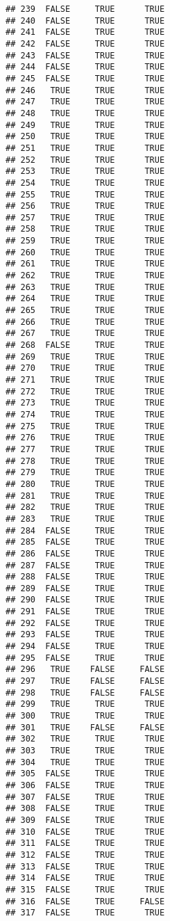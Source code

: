\documentclass[
]{article}
\begin{document}
\begin{verbatim}
## 239  FALSE     TRUE      TRUE
## 240  FALSE     TRUE      TRUE
## 241  FALSE     TRUE      TRUE
## 242  FALSE     TRUE      TRUE
## 243  FALSE     TRUE      TRUE
## 244  FALSE     TRUE      TRUE
## 245  FALSE     TRUE      TRUE
## 246   TRUE     TRUE      TRUE
## 247   TRUE     TRUE      TRUE
## 248   TRUE     TRUE      TRUE
## 249   TRUE     TRUE      TRUE
## 250   TRUE     TRUE      TRUE
## 251   TRUE     TRUE      TRUE
## 252   TRUE     TRUE      TRUE
## 253   TRUE     TRUE      TRUE
## 254   TRUE     TRUE      TRUE
## 255   TRUE     TRUE      TRUE
## 256   TRUE     TRUE      TRUE
## 257   TRUE     TRUE      TRUE
## 258   TRUE     TRUE      TRUE
## 259   TRUE     TRUE      TRUE
## 260   TRUE     TRUE      TRUE
## 261   TRUE     TRUE      TRUE
## 262   TRUE     TRUE      TRUE
## 263   TRUE     TRUE      TRUE
## 264   TRUE     TRUE      TRUE
## 265   TRUE     TRUE      TRUE
## 266   TRUE     TRUE      TRUE
## 267   TRUE     TRUE      TRUE
## 268  FALSE     TRUE      TRUE
## 269   TRUE     TRUE      TRUE
## 270   TRUE     TRUE      TRUE
## 271   TRUE     TRUE      TRUE
## 272   TRUE     TRUE      TRUE
## 273   TRUE     TRUE      TRUE
## 274   TRUE     TRUE      TRUE
## 275   TRUE     TRUE      TRUE
## 276   TRUE     TRUE      TRUE
## 277   TRUE     TRUE      TRUE
## 278   TRUE     TRUE      TRUE
## 279   TRUE     TRUE      TRUE
## 280   TRUE     TRUE      TRUE
## 281   TRUE     TRUE      TRUE
## 282   TRUE     TRUE      TRUE
## 283   TRUE     TRUE      TRUE
## 284  FALSE     TRUE      TRUE
## 285  FALSE     TRUE      TRUE
## 286  FALSE     TRUE      TRUE
## 287  FALSE     TRUE      TRUE
## 288  FALSE     TRUE      TRUE
## 289  FALSE     TRUE      TRUE
## 290  FALSE     TRUE      TRUE
## 291  FALSE     TRUE      TRUE
## 292  FALSE     TRUE      TRUE
## 293  FALSE     TRUE      TRUE
## 294  FALSE     TRUE      TRUE
## 295  FALSE     TRUE      TRUE
## 296   TRUE    FALSE     FALSE
## 297   TRUE    FALSE     FALSE
## 298   TRUE    FALSE     FALSE
## 299   TRUE     TRUE      TRUE
## 300   TRUE     TRUE      TRUE
## 301   TRUE    FALSE     FALSE
## 302   TRUE     TRUE      TRUE
## 303   TRUE     TRUE      TRUE
## 304   TRUE     TRUE      TRUE
## 305  FALSE     TRUE      TRUE
## 306  FALSE     TRUE      TRUE
## 307  FALSE     TRUE      TRUE
## 308  FALSE     TRUE      TRUE
## 309  FALSE     TRUE      TRUE
## 310  FALSE     TRUE      TRUE
## 311  FALSE     TRUE      TRUE
## 312  FALSE     TRUE      TRUE
## 313  FALSE     TRUE      TRUE
## 314  FALSE     TRUE      TRUE
## 315  FALSE     TRUE      TRUE
## 316  FALSE     TRUE     FALSE
## 317  FALSE     TRUE      TRUE

\end{verbatim}
\end{document}
